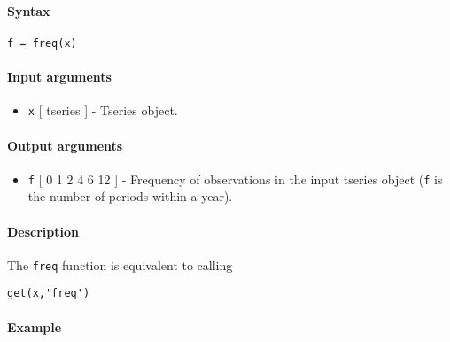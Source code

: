 


	\paragraph{Syntax}

\begin{verbatim}
f = freq(x)
\end{verbatim}

\paragraph{Input arguments}

\begin{itemize}
\itemsep1pt\parskip0pt
\item
  \texttt{x} {[} tseries {]} - Tseries object.
\end{itemize}

\paragraph{Output arguments}

\begin{itemize}
\itemsep1pt\parskip0pt
\item
  \texttt{f} {[} 0 \textbar{} 1 \textbar{} 2 \textbar{} 4 \textbar{} 6
  \textbar{} 12 {]} - Frequency of observations in the input tseries
  object (\texttt{f} is the number of periods within a year).
\end{itemize}

\paragraph{Description}

The \texttt{freq} function is equivalent to calling

\begin{verbatim}
get(x,'freq')
\end{verbatim}

\paragraph{Example}


